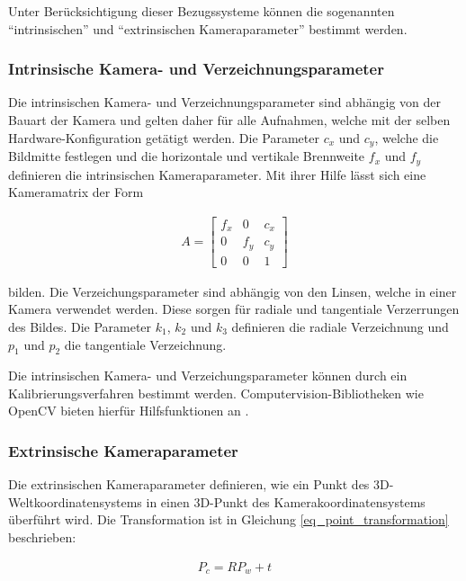 Unter Berücksichtigung dieser Bezugssysteme können die sogenannten ``intrinsischen'' und ``extrinsischen Kameraparameter''
bestimmt werden.

\subsubsection{Intrinsische Kamera- und Verzeichnungsparameter}

Die intrinsischen Kamera- und Verzeichnungsparameter sind abhängig von der Bauart der Kamera und gelten
daher für alle Aufnahmen, welche mit der selben Hardware-Konfiguration getätigt werden.
Die Parameter $c_x$ und $c_y$, welche die Bildmitte festlegen und die
horizontale und vertikale Brennweite $f_x$ und $f_y$ definieren die intrinsischen Kameraparameter.
Mit ihrer Hilfe lässt sich eine Kameramatrix der Form

\begin{ceqn}
\begin{align}
A =
 \begin{bmatrix}
  f_x & 0 & c_x \\
  0 & f_y & c_y \\
  0 & 0 & 1
 \end{bmatrix}
\end{align}
\end{ceqn}

bilden.
Die Verzeichungsparameter sind abhängig von den Linsen, welche in einer Kamera verwendet werden. Diese sorgen
für radiale und tangentiale Verzerrungen des Bildes. Die Parameter $k_1$, $k_2$ und $k_3$ definieren die
radiale Verzeichnung und $p_1$ und $p_2$ die tangentiale Verzeichnung. \cite[]{Meissner2007}

Die intrinsischen Kamera- und Verzeichungsparameter können durch ein Kalibrierungsverfahren bestimmt werden.
Computervision-Bibliotheken wie OpenCV bieten hierfür Hilfsfunktionen an \cite[]{DevTeamOpenCV2018}.

\subsubsection{Extrinsische Kameraparameter}

Die extrinsischen Kameraparameter definieren, wie ein Punkt des 3D-Weltkoordinatensystems in einen 3D-Punkt
des Kamerakoordinatensystems überführt wird.
Die Transformation ist in Gleichung \ref{eq_point_transformation} beschrieben:

\begin{ceqn}
\begin{align}
\label{eq_point_transformation}
    P_c = R P_w + t
\end{align}
\end{ceqn}

